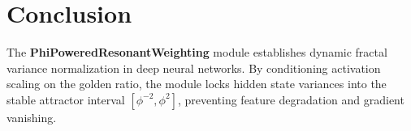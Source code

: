 \section{Conclusion}
The \textbf{PhiPoweredResonantWeighting} module establishes dynamic fractal variance normalization in deep neural networks. By conditioning activation scaling on the golden ratio, the module locks hidden state variances into the stable attractor interval $[\phi^{-2}, \phi^2]$, preventing feature degradation and gradient vanishing.